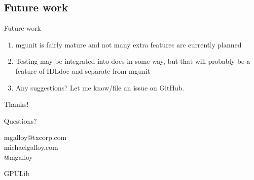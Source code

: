 \documentclass[12pt, handout]{beamer}
\begin{document}
\subsection{Future work}
\begin{frame}[t]{Future work}
  \begin{enumerate}
    \item mgunit is fairly mature and not many extra features are currently planned
    \item Testing may be integrated into docs in some way, but that will probably be a feature of IDLdoc and separate from mgunit
    \item Any suggestions? Let me know/file an issue on GitHub.
  \end{enumerate}
\end{frame}

\begin{frame}{Thanks!}
  \begin{center}

{\huge Questions?} \\

\bigskip

{mgalloy@txcorp.com} \\
{michaelgalloy.com} \\
{@mgalloy}

\end{center}
\end{frame}

\appendix

\begin{frame}{GPULib}
\hypertarget{gpulib}{}

\hyperlink{examples}{}
\end{frame}
\end{document}
